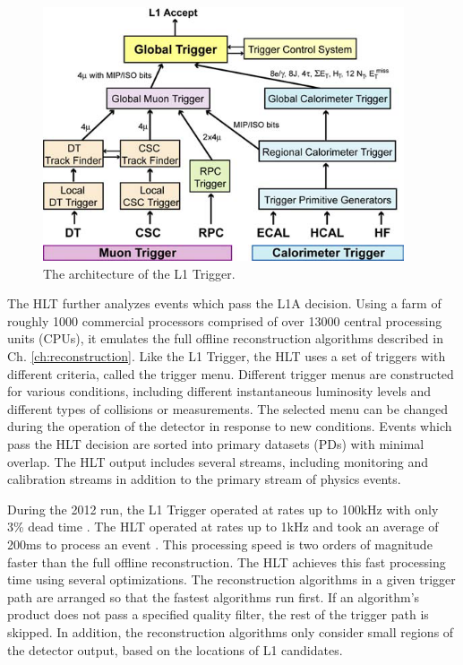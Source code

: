 \documentclass[12pt]{thesis}  %
\begin{document}
\begin{figure}[hbt]
\begin{center}
\includegraphics[width=0.95\textwidth]{figures/L1_architecture.png}
\caption{The architecture of the L1 Trigger.}
\label{fig:L1-trigger}
\end{center}
\end{figure}

The HLT further analyzes events which pass the L1A decision. Using a farm of roughly 1000 commercial processors comprised of over 13000 central processing units (CPUs), it emulates the full offline reconstruction algorithms described in Ch. \ref{ch:reconstruction}. Like the L1 Trigger, the HLT uses a set of triggers with different criteria, called the trigger menu. Different trigger menus are constructed for various conditions, including different instantaneous luminosity levels and different types of collisions or measurements. The selected menu can be changed during the operation of the detector in response to new conditions. Events which pass the HLT decision are sorted into primary datasets (PDs) with minimal overlap. The HLT output includes several streams, including monitoring and calibration streams in addition to the primary stream of physics events.

During the 2012 run, the L1 Trigger operated at rates up to 100\unit{kHz} with only 3\% dead time \cite{Brooke:2013hnf}. The HLT operated at rates up to 1\unit{kHz} and took an average of 200\unit{ms} to process an event \cite{Trocino:2014jya}. This processing speed is two orders of magnitude faster than the full offline reconstruction. The HLT achieves this fast processing time using several optimizations. The reconstruction algorithms in a given trigger path are arranged so that the fastest algorithms run first. If an algorithm's product does not pass a specified quality filter, the rest of the trigger path is skipped. In addition, the reconstruction algorithms only consider small regions of the detector output, based on the locations of L1 candidates.
\end{document}
